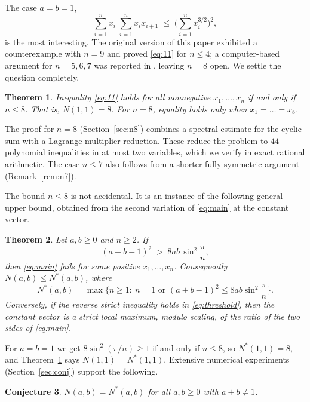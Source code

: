 \documentclass[11pt]{article}
\newtheorem{theorem}{Theorem}[section]
\newtheorem{conjecture}[theorem]{Conjecture}
\theoremstyle{remark}
\numberwithin{equation}{section}
\begin{document}
The case $a=b=1$,
\begin{equation}\label{eq:11}
\sum_{i=1}^n x_i\;\sum_{i=1}^n x_ix_{i+1}\;\le\;\Big(\sum_{i=1}^n x_i^{3/2}\Big)^2,
\end{equation}
is the most interesting. The original version of this paper \cite{j} exhibited a counterexample with
$n=9$ and proved \eqref{eq:11} for $n\le 4$; a computer-based argument for $n=5,6,7$ was
reported in \cite{Hos}, leaving $n=8$ open. We settle the question completely.

\begin{theorem}\label{thm:N11}
Inequality \eqref{eq:11} holds for all nonnegative $x_1,\dots,x_n$ if and only if $n\le 8$.
That is, $N(1,1)=8$. For $n=8$, equality holds only when $x_1=\dots=x_8$.
\end{theorem}

The proof for $n=8$ (Section~\ref{sec:n8}) combines a spectral estimate for the cyclic sum
with a Lagrange-multiplier reduction. These reduce the problem to $44$ polynomial inequalities
in at most two variables, which we verify in exact rational arithmetic. The case $n\le 7$ also
follows from a shorter fully symmetric argument (Remark~\ref{rem:n7}).

The bound $n\le 8$ is not accidental. It is an instance of the following general upper bound,
obtained from the second variation of \eqref{eq:main} at the constant vector.

\begin{theorem}\label{thm:upper}
Let $a,b\ge0$ and $n\ge 2$. If
\begin{equation}\label{eq:threshold}
(a+b-1)^2\;>\;8ab\,\sin^2\!\frac{\pi}{n},
\end{equation}
then \eqref{eq:main} fails for some positive $x_1,\dots,x_n$. Consequently
$N(a,b)\le N^*(a,b)$, where
\[
N^*(a,b)=\max\Big\{n\ge 1:\ n=1 \text{ or } (a+b-1)^2\le 8ab\sin^2\frac{\pi}{n}\Big\}.
\]
Conversely, if the reverse strict inequality holds in \eqref{eq:threshold}, then the constant vector
is a strict local maximum, modulo scaling, of the ratio of the two sides of \eqref{eq:main}.
\end{theorem}

For $a=b=1$ we get $8\sin^2(\pi/n)\ge 1$ if and only if $n\le 8$, so $N^*(1,1)=8$, and
Theorem~\ref{thm:N11} says $N(1,1)=N^*(1,1)$. Extensive numerical experiments
(Section~\ref{sec:conj}) support the following.

\begin{conjecture}\label{conj:main}
$N(a,b)=N^*(a,b)$ for all $a,b\ge 0$ with $a+b\ne 1$.
\end{conjecture}
\end{document}
